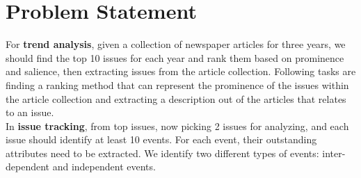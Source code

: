 \section{Problem Statement}
For \textbf{trend analysis}, given a collection of newspaper articles for three years, we should find the top 10 issues for each year and rank them based on prominence and salience, then extracting issues from the article collection. Following tasks are finding a ranking method that can represent the prominence of the issues within the article collection and extracting a description out of the articles that relates to an issue.\\
In \textbf{issue tracking}, from top issues, now picking 2 issues for analyzing, and each issue should identify at least 10 events. For each event, their outstanding attributes need to be extracted. We identify two different types of events: inter-dependent and independent events.